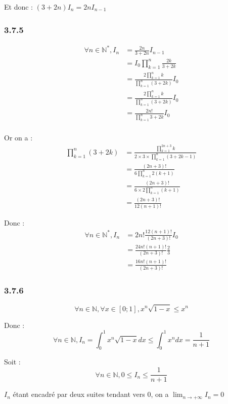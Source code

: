 \documentclass[a4paper,10pt]{report}
\begin{document}
Et donc : $(3+2n)I_n = 2n I_{n-1}$

\subsubsection*{3.7.5}

\begin{equation*}
	\begin{split}
		\forall n \in \mathbb{N}^*, I_n 
			&= \frac{2n}{3+2n}I_{n-1} \\
			&= I_0 \prod_{k=1}^{n}\frac{2k}{3+2k}\\
			&= \frac{2\prod_{k=1}^{n} k}{\prod_{k=1}^{n} (3+2k)} I_0 \\
			&= \frac{2\prod_{k=1}^{n} k}{\prod_{k=1}^{n} (3+2k)} I_0 \\
			&= \frac{2 n!}{\prod_{k=1}^{n} 3+2k} I_0 \\
	\end{split}
\end{equation*}

Or on a :
\begin{equation*}
	\begin{split}
		\prod_{k=1}^{n} (3+2k) &= \frac{\prod_{k=1}^{2n+3} k}{2 \times 3 \times \prod_{k=1}^{n} (3+2k-1)} \\
		                       &= \frac{(2n+3)!}{6 \prod_{k=1}^{n} 2(k+1)} \\
		                       &= \frac{(2n+3)!}{6 \times 2 \prod_{k=1}^{n} (k+1)} \\
		                       &= \frac{(2n+3)!}{12 (n+1)!}
	\end{split}
\end{equation*}

Donc :
\begin{equation*}
	\begin{split}
		\forall n \in \mathbb{N}^*, I_n 
			&= 2 n! \frac{12 (n+1)!}{(2n+3)!}I_0 \\
			&=  \frac{24 n!(n+1)!}{(2n+3)!} \frac{2}{3} \\
			&=  \frac{16 n!(n+1)!}{(2n+3)!}
	\end{split}
\end{equation*}

\subsubsection*{3.7.6}
\begin{displaymath}
	\forall n \in \mathbb{N}, \forall x \in [0;1], x^n \sqrt{1-x} \leq x^n
\end{displaymath}

Donc :
\begin{displaymath}
	\forall n \in \mathbb{N},I_n = \int_0^1 x^n \sqrt{1-x} dx \leq \int_0^1 x^n dx = \frac{1}{n+1}
\end{displaymath}

Soit :
\begin{displaymath}
	\forall n \in \mathbb{N}, 0\leq I_n  \leq  \frac{1}{n+1}
\end{displaymath}

$I_n$ étant encadré par deux suites tendant vers $0$, on a $\lim_{n \rightarrow +\infty} I_n = 0$
\end{document}
